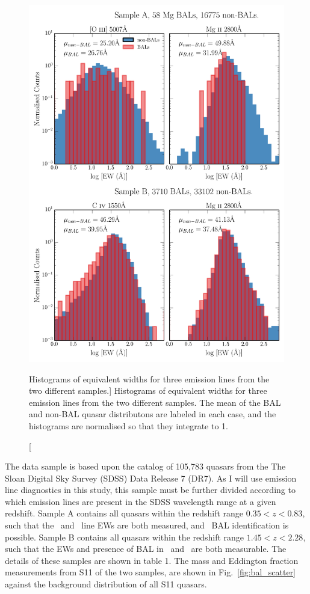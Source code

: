 \begin{figure} %
\centering
\includegraphics[width=1.0\textwidth]{figures/ewpaper/ew_hist_qsos.png}
\caption
[Histograms of equivalent widths for three emission lines from the two different samples.]
{
Histograms of equivalent widths for three emission lines from the two different samples.
The mean of the BAL and non-BAL quasar distributons are labeled in each case, and
the histograms are normalised so that they integrate to 1.
}
\label{fig:ew_hists}
\end{figure} %

The data sample is based upon the
\citet[][hereafter S11]{shen2011} catalog of
105,783 quasars from the The Sloan Digital Sky Survey (SDSS) 
Data Release 7 (DR7). 
As I will use emission line diagnostics in this study,
this sample must be further divided according to which 
emission lines are present in 
the SDSS wavelength range at a given redshift. 
Sample A contains all quasars within the redshift range $0.35<z<0.83$, 
such that the \mgline\ and \oiiifull\ line EWs are both measured, 
and \mg\ BAL identification
is possible.  Sample B contains all quasars within the redshift 
range $1.45<z<2.28$, such that 
the EWs and presence of BAL in \mgline\ and \civline\ are both measurable.
The details of these samples are shown in table 1.
The mass and Eddington fraction measurements from S11 of the two samples,
are shown in Fig.~\ref{fig:bal_scatter}
against the background distribution of all S11 quasars.


